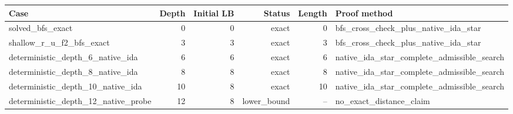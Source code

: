 {\small
\begin{tabular}{lrrrrl}
\hline
Case & Depth & Initial LB & Status & Length & Proof method \\
\hline
solved\_bfs\_exact & 0 & 0 & exact & 0 & bfs\_cross\_check\_plus\_native\_ida\_star \\
shallow\_r\_u\_f2\_bfs\_exact & 3 & 3 & exact & 3 & bfs\_cross\_check\_plus\_native\_ida\_star \\
deterministic\_depth\_6\_native\_ida & 6 & 6 & exact & 6 & native\_ida\_star\_complete\_admissible\_search \\
deterministic\_depth\_8\_native\_ida & 8 & 8 & exact & 8 & native\_ida\_star\_complete\_admissible\_search \\
deterministic\_depth\_10\_native\_ida & 10 & 8 & exact & 10 & native\_ida\_star\_complete\_admissible\_search \\
deterministic\_depth\_12\_native\_probe & 12 & 8 & lower\_bound & -- & no\_exact\_distance\_claim \\
\hline
\end{tabular}
}
